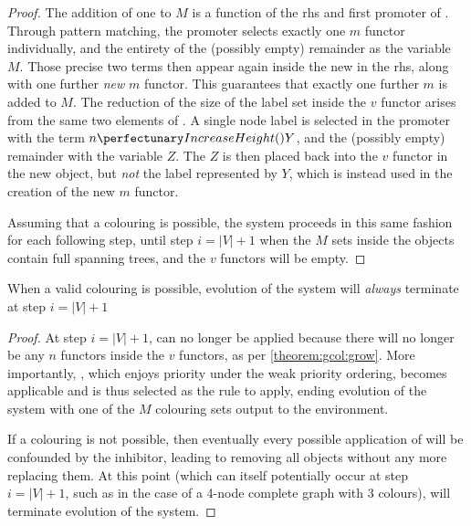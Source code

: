 \begin{proof}
The addition of one to \(M\) is a function of the \gls{rhs} and first \gls{promoter} of .  Through pattern matching, the \gls{promoter} selects exactly one \(m\) \gls{functor} individually, and the entirety of the (possibly empty) remainder as the variable \(M\).  Those precise two terms then appear again inside the new \bo{} in the \gls{rhs}, along with one further \emph{new} \(m\) \gls{functor}.  This guarantees that exactly one further \(m\) is added to \(M\).  The reduction of the size of the label set inside the \(v\) \gls{functor} arises from the same two elements of .  A single node label is selected in the \gls{promoter} with the term \(\cpfunc{n}{Y}\), and the (possibly empty) remainder with the variable \(Z\).  The \(Z\) is then placed back into the \(v\) \gls{functor} in the new \bo{} object, but \emph{not} the label represented by \(Y\), which is instead used in the creation of the new \(m\) \gls{functor}.


Assuming that a colouring is possible, the system proceeds in this same fashion for each following step, until step \(i = |V| + 1\) when the \(M\) sets inside the \bo{} objects contain full spanning trees, and the \(v\) \glspl{functor} will be empty.
\end{proof}

\begin{lemma}
When a valid colouring is possible, evolution of the system will \emph{always} terminate at step \(i = |V| + 1\)
\end{lemma}

\begin{proof}
At step \(i = |V| + 1\),  can no longer be applied because there will no longer be any \(n\) \glspl{functor} inside the \(v\) \glspl{functor}, as per \cref{theorem:gcol:grow}.  More importantly, , which enjoys priority under the weak priority ordering, becomes applicable and is thus selected as the rule to apply, ending evolution of the system with one of the \(M\) colouring sets output to the environment.

If a colouring is not possible, then eventually every possible application of  will be confounded by the \gls{inhibitor}, leading to  removing all \bo{} objects without any more replacing them.  At this point (which can itself potentially occur at step \(i = |V| + 1\), such as in the case of a 4-node complete graph with 3 colours),  will terminate evolution of the system.
\end{proof}

